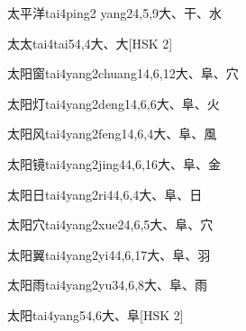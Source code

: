 \begin{entry}{太平洋}{tai4ping2 yang2}{4,5,9}{⼤、⼲、⽔}
\end{entry}

\begin{entry}{太太}{tai4tai5}{4,4}{⼤、⼤}[HSK 2]
\end{entry}

\begin{entry}{太阳窗}{tai4yang2chuang1}{4,6,12}{⼤、⾩、⽳}
\end{entry}

\begin{entry}{太阳灯}{tai4yang2deng1}{4,6,6}{⼤、⾩、⽕}
\end{entry}

\begin{entry}{太阳风}{tai4yang2feng1}{4,6,4}{⼤、⾩、⾵}
\end{entry}

\begin{entry}{太阳镜}{tai4yang2jing4}{4,6,16}{⼤、⾩、⾦}
\end{entry}

\begin{entry}{太阳日}{tai4yang2ri4}{4,6,4}{⼤、⾩、⽇}
\end{entry}

\begin{entry}{太阳穴}{tai4yang2xue2}{4,6,5}{⼤、⾩、⽳}
\end{entry}

\begin{entry}{太阳翼}{tai4yang2yi4}{4,6,17}{⼤、⾩、⽻}
\end{entry}

\begin{entry}{太阳雨}{tai4yang2yu3}{4,6,8}{⼤、⾩、⾬}
\end{entry}

\begin{entry}{太阳}{tai4yang5}{4,6}{⼤、⾩}[HSK 2]
\end{entry}

